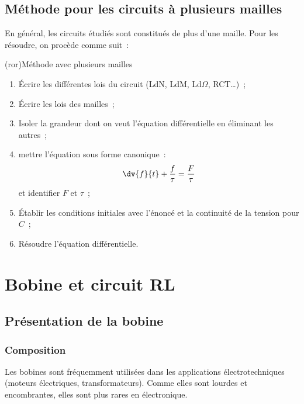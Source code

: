 \documentclass[../../main/main.tex]{subfiles}
\begin{document}
\subsection{Méthode pour les circuits à plusieurs mailles}
En général, les circuits étudiés sont constitués de plus d'une maille. Pour les
résoudre, on procède comme suit~:
\begin{tcb}(ror){Méthode avec plusieurs mailles}
	\begin{enumerate}[label=\sqenumi]
		\item Écrire les différentes lois du circuit (LdN, LdM, Ld$\Omega$, RCT…)~;
		\item Écrire les lois des mailles~;
		\item Isoler la grandeur dont on veut l'équation différentielle en éliminant
		      les autres~;
		\item mettre l'équation sous forme canonique~:
		      \[
			      \dv{f}{t} + \frac{f}{\tau} = \frac{F}{\tau}
		      \]
		      et identifier $F$ et $\tau$~;
		\item Établir les conditions initiales avec l'énoncé et la continuité de la
		      tension pour $C$~;
		\item Résoudre l'équation différentielle.
	\end{enumerate}

\end{tcb}


\section{Bobine et circuit RL}
\subsection{Présentation de la bobine}
\subsubsection{Composition}

Les bobines sont fréquemment utilisées dans les applications électrotechniques
(moteurs électriques, transformateurs). Comme elles sont lourdes et
encombrantes, elles sont plus rares en électronique.
\end{document}
